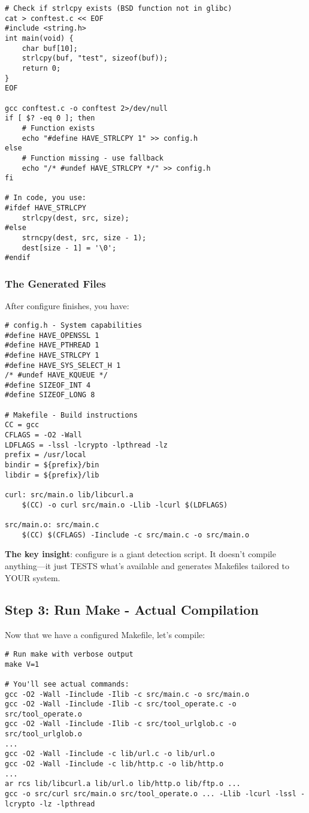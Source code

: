 \begin{lstlisting}
# Check if strlcpy exists (BSD function not in glibc)
cat > conftest.c << EOF
#include <string.h>
int main(void) {
    char buf[10];
    strlcpy(buf, "test", sizeof(buf));
    return 0;
}
EOF

gcc conftest.c -o conftest 2>/dev/null
if [ $? -eq 0 ]; then
    # Function exists
    echo "#define HAVE_STRLCPY 1" >> config.h
else
    # Function missing - use fallback
    echo "/* #undef HAVE_STRLCPY */" >> config.h
fi

# In code, you use:
#ifdef HAVE_STRLCPY
    strlcpy(dest, src, size);
#else
    strncpy(dest, src, size - 1);
    dest[size - 1] = '\0';
#endif
\end{lstlisting}

\subsubsection{The Generated Files}

After configure finishes, you have:

\begin{lstlisting}
# config.h - System capabilities
#define HAVE_OPENSSL 1
#define HAVE_PTHREAD 1
#define HAVE_STRLCPY 1
#define HAVE_SYS_SELECT_H 1
/* #undef HAVE_KQUEUE */
#define SIZEOF_INT 4
#define SIZEOF_LONG 8

# Makefile - Build instructions
CC = gcc
CFLAGS = -O2 -Wall
LDFLAGS = -lssl -lcrypto -lpthread -lz
prefix = /usr/local
bindir = ${prefix}/bin
libdir = ${prefix}/lib

curl: src/main.o lib/libcurl.a
	$(CC) -o curl src/main.o -Llib -lcurl $(LDFLAGS)

src/main.o: src/main.c
	$(CC) $(CFLAGS) -Iinclude -c src/main.c -o src/main.o
\end{lstlisting}

\textbf{The key insight}: configure is a giant detection script. It doesn't compile anything—it just TESTS what's available and generates Makefiles tailored to YOUR system.

\subsection{Step 3: Run Make - Actual Compilation}

Now that we have a configured Makefile, let's compile:

\begin{lstlisting}
# Run make with verbose output
make V=1

# You'll see actual commands:
gcc -O2 -Wall -Iinclude -Ilib -c src/main.c -o src/main.o
gcc -O2 -Wall -Iinclude -Ilib -c src/tool_operate.c -o src/tool_operate.o
gcc -O2 -Wall -Iinclude -Ilib -c src/tool_urlglob.c -o src/tool_urlglob.o
...
gcc -O2 -Wall -Iinclude -c lib/url.c -o lib/url.o
gcc -O2 -Wall -Iinclude -c lib/http.c -o lib/http.o
...
ar rcs lib/libcurl.a lib/url.o lib/http.o lib/ftp.o ...
gcc -o src/curl src/main.o src/tool_operate.o ... -Llib -lcurl -lssl -lcrypto -lz -lpthread
\end{lstlisting}

